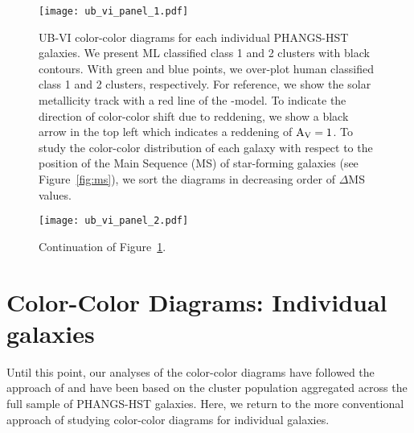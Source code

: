 \documentclass[linenumbers]{aastex63}
\begin{document}
\begin{figure*}
\texttt{[image: ub\_vi\_panel\_1.pdf]}
 \caption{UB-VI color-color diagrams for each individual PHANGS-HST galaxies. We present ML classified class 1 and 2 clusters with black contours. With green and blue points, we over-plot human classified class 1 and 2 clusters, respectively. For reference, we show the solar metallicity track with a red line of the -model. To indicate the direction of color-color shift due to reddening, we show a black arrow in the top left which indicates a reddening of ${\rm A_{V} = 1}$. To study the color-color distribution of each galaxy with respect to the position of the Main Sequence (MS) of star-forming galaxies (see Figure~\ref{fig:ms}), we sort the diagrams in decreasing order of $\Delta$MS values.}
 \label{fig:ub_vi_1}
\end{figure*}
%
\begin{figure*}
\texttt{[image: ub\_vi\_panel\_2.pdf]}
 \caption{Continuation of Figure~\ref{fig:ub_vi_1}.}
 \label{fig:ub_vi_2}
\end{figure*}

\section{Color-Color Diagrams: Individual galaxies}\label{ssect:cc_sf}
%
%

Until this point, our analyses of the color-color diagrams have followed the approach of \citet{lee23ubvi} and have been based on the cluster population aggregated across the full sample of PHANGS-HST galaxies.  Here, we return to the more conventional approach of studying color-color diagrams for individual galaxies.
\end{document}
